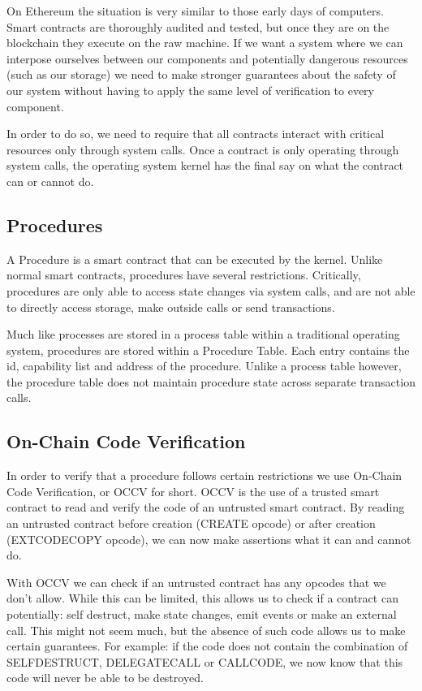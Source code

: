 \documentclass[english,a4paper]{article}
\begin{document}
On Ethereum the situation is very similar to those early days of
computers. Smart contracts are thoroughly audited and tested, but once
they are on the blockchain they execute on the raw machine. If we want a
system where we can interpose ourselves between our components and
potentially dangerous resources (such as our storage) we need to make
stronger guarantees about the safety of our system without having to
apply the same level of verification to every component.

In order to do so, we need to require that all contracts interact with
critical resources only through system calls. Once a contract is only
operating through system calls, the operating system kernel has the
final say on what the contract can or cannot do.

\subsection{Procedures}\label{procedures}
A Procedure is a smart contract that can be executed by the kernel.
Unlike normal smart contracts, procedures have several restrictions.
Critically, procedures are only able to access state changes via system
calls, and are not able to directly access storage, make outside calls
or send transactions.

Much like processes are stored in a process table within a traditional
operating system, procedures are stored within a Procedure Table. Each
entry contains the id, capability list and address of the procedure.
Unlike a process table however, the procedure table does not maintain
procedure state across separate transaction calls.

\subsection{On-Chain Code
Verification}\label{on-chain-code-verification}
In order to verify that a procedure follows certain restrictions we use
On-Chain Code Verification, or OCCV for short. OCCV is the use of a
trusted smart contract to read and verify the code of an untrusted smart
contract. By reading an untrusted contract before creation (CREATE
opcode) or after creation (EXTCODECOPY opcode), we can now make
assertions what it can and cannot do.

With OCCV we can check if an untrusted contract has any opcodes that we
don't allow. While this can be limited, this allows us to check if a
contract can potentially: self destruct, make state changes, emit events
or make an external call. This might not seem much, but the absence of
such code allows us to make certain guarantees. For example: if the code
does not contain the combination of SELFDESTRUCT, DELEGATECALL or
CALLCODE, we now know that this code will never be able to be destroyed.
\end{document}
